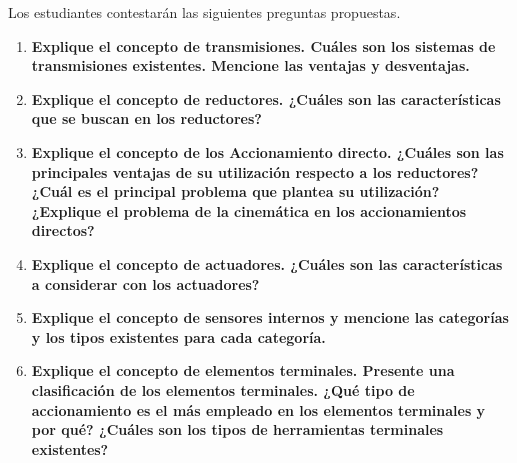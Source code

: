 Los estudiantes contestarán las siguientes preguntas propuestas.

\begin{enumerate}
    \item \textbf{Explique el concepto de transmisiones. Cuáles son los sistemas de transmisiones existentes. Mencione las ventajas y desventajas.}
    \item \textbf{Explique el concepto de reductores. ¿Cuáles son las características que se buscan en los reductores?}
    \item \textbf{Explique el concepto de los Accionamiento directo. ¿Cuáles son las principales ventajas de su utilización respecto a los reductores? ¿Cuál es el principal problema que plantea su utilización? ¿Explique el problema de la cinemática en los accionamientos directos?}
    \item \textbf{Explique el concepto de actuadores. ¿Cuáles son las características a considerar con los actuadores?}
    \item \textbf{Explique el concepto de sensores internos y mencione las categorías y los tipos existentes para cada categoría.}
    \item \textbf{Explique el concepto de elementos terminales. Presente una clasificación de los elementos terminales. ¿Qué tipo de accionamiento es el más empleado en los elementos terminales y por qué? ¿Cuáles son los tipos de herramientas terminales existentes?}
\end{enumerate}